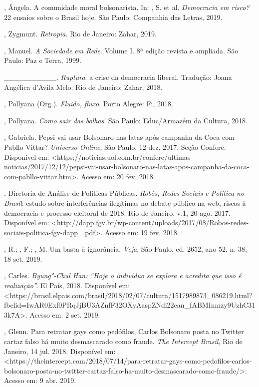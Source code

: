 \begin{Parskip}
, Ângela. A comunidade moral bolsonarista. In: , S. et
al. \emph{Democracia em risco?} 22 ensaios sobre o Brasil hoje. São
Paulo: Companhia das Letras, 2019.

, Zygmunt. \emph{Retropia}. Rio de Janeiro: Zahar, 2019.

, Manuel. \emph{A Sociedade em Rede}. Volume I. 8ª edição
revista e ampliada. São Paulo: Paz e Terra, 1999.

\_\_\_\_\_\_\_\_\_\_. \emph{Ruptura}: a crise da democracia liberal.
Tradução: Joana Angélica d'Avila Melo. Rio de Janeiro: Zahar, 2018.

, Pollyana (Org.). \emph{Fluido, fluxo}. Porto Alegre: Fi, 2018.

, Pollyana. \emph{Como sair das bolhas}. São Paulo: Educ/Armazém
da Cultura, 2018.

, Gabriela. Pepsi vai usar Bolsonaro nas latas após campanha da
Coca com Pabllo Vittar? \emph{Universo Online}, São Paulo, 12 dez. 2017.
Seção  Confere. Disponível em:
\textless{}https://noticias.uol.com.br/confere/ultimas-noticias/2017/12/12/pepsi-vai-usar-bolsonaro-nas-latas-apos-campanha-da-coca-com-pabllo-vittar.htm\textgreater{}.
Acesso em: 20 fev. 2018.

. Diretoria de Análise de Políticas Públicas.
\emph{Robôs, Redes Sociais e Política no Brasil}: estudo sobre
interferências ilegítimas no debate público na web, riscos à democracia
e processo eleitoral de 2018. Rio de Janeiro, v.1, 20 ago. 2017.
Disponível em:
\textless{}http://dapp.fgv.br/wp-content/uploads/2017/08/Robos-redes-sociais-politica-fgv-dapp\_.pdf\textgreater{}.
Acesso em: 19 fev. 2018.

, R.; , F.; , M. Um basta à ignorância. \emph{Veja},
São Paulo, ed. 2652, ano 52, n. 38, 18 set. 2019.

, Carles. \emph{Byung"-Chul Han: ``Hoje o indivíduo se explora e
acredita que isso é realização''.} El País, 2018. Disponível em:
\textless{}https://brasil.elpais.com/brasil/2018/02/07/cultura/1517989873\_086219.html?fbclid=IwAR0Exf0PRqJjBU3AZnfF32OXyAaspZNdi22can\_fABMInmzy9UzhC313k7A\textgreater{}.
Acesso em: 2 set. 2019.

, Glenn. Para retratar gays como pedófilos, Carlos Bolsonaro
posta no Twitter cartaz falso há muito desmascarado como fraude.
\emph{The Intercept Brasil}, Rio de Janeiro, 14 jul. 2018. Disponível
em:
\textless{}https://theintercept.com/2018/07/14/para-retratar-gays-como-pedofilos-carlos-bolsonaro-posta-no-twitter-cartaz-falso-ha-muito-desmascarado-como-fraude/\textgreater{}.
Acesso em: 9 abr. 2019.


\end{Parskip}
